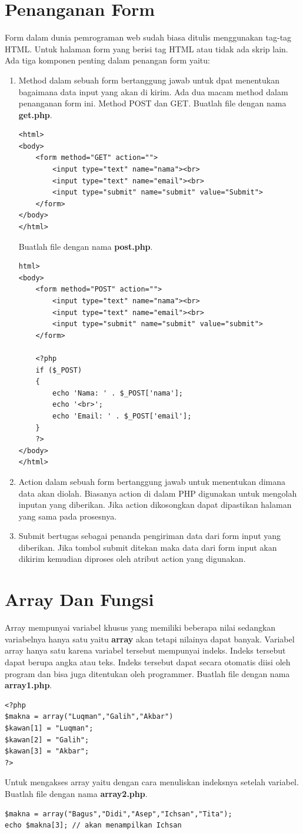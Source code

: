 \section{Penanganan Form}
Form dalam dunia pemrograman web sudah biasa ditulis menggunakan tag-tag HTML. Untuk halaman form yang berisi tag HTML atau tidak ada skrip lain. Ada tiga komponen penting dalam penangan form yaitu:
\begin{enumerate}
\item Method dalam sebuah form bertanggung jawab untuk dpat menentukan bagaimana data input yang akan di kirim. Ada dua macam method dalam penanganan form ini. Method POST dan GET. Buatlah file dengan nama \textbf{get.php}.
\begin{lstlisting}
<html>
<body>
	<form method="GET" action="">
		<input type="text" name="nama"><br>
		<input type="text" name="email"><br>
		<input type="submit" name="submit" value="Submit">
	</form>
</body>
</html>
\end{lstlisting}
Buatlah file dengan nama \textbf{post.php}.
\begin{lstlisting}
html>
<body>
	<form method="POST" action="">
		<input type="text" name="nama"><br>
		<input type="text" name="email"><br>
		<input type="submit" name="submit" value="submit">
	</form>

	<?php
	if ($_POST)
	{
		echo 'Nama: ' . $_POST['nama'];
		echo '<br>';
		echo 'Email: ' . $_POST['email'];
	}
	?>
</body>
</html>
\end{lstlisting}
\item Action dalam sebuah form bertanggung jawab untuk menentukan dimana data akan diolah. Biasanya action di dalam PHP digunakan untuk mengolah inputan yang diberikan. Jika action dikosongkan dapat dipastikan halaman yang sama pada prosesnya.
\item Submit bertugas sebagai penanda pengiriman data dari form input yang diberikan. Jika tombol submit ditekan maka data dari form input akan dikirim kemudian diproses oleh atribut action yang digunakan.
\end{enumerate}


\section{Array Dan Fungsi}
Array mempunyai variabel khusus yang memiliki beberapa nilai sedangkan variabelnya hanya satu yaitu \textbf{array} akan tetapi nilainya dapat banyak. Variabel array hanya satu karena variabel tersebut mempunyai indeks. Indeks tersebut dapat berupa angka atau teks. Indeks tersebut dapat secara otomatis diisi oleh program dan bisa juga ditentukan oleh programmer.  Buatlah file dengan nama \textbf{array1.php}.
\begin{lstlisting}
<?php
$makna = array("Luqman","Galih","Akbar")
$kawan[1] = "Luqman";
$kawan[2] = "Galih";
$kawan[3] = "Akbar";
?>
\end{lstlisting}
Untuk mengakses array yaitu dengan cara menuliskan indeksnya setelah variabel. Buatlah file dengan nama \textbf{array2.php}.
\begin{lstlisting}
$makna = array("Bagus","Didi","Asep","Ichsan","Tita");
echo $makna[3]; // akan menampilkan Ichsan
\end{lstlisting}

